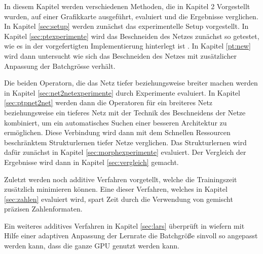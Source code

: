 In diesem Kapitel werden verschiedenen Methoden, die in Kapitel 2 Vorgestellt wurden, auf einer Grafikkarte ausgeführt, evaluiert und die Ergebnisse verglichen. In Kapitel \ref{sec:setup} werden zunächst das experimentelle Setup vorgestellt. In Kapitel \ref{sec:ptexperimente} wird das Beschneiden des Netzes zunächst so getestet, wie es in der vorgefertigten Implementierung hinterlegt ist \cite{ptImpl}. In Kapitel \ref{pt:new} wird dann untersucht wie sich das Beschneiden des Netzes mit zusätzlicher Anpassung der Batchgrösse verhält.

Die beiden Operatorn, die das Netz tiefer beziehungsweise breiter machen werden in Kapitel \ref{sec:net2netexperimente} durch Experimente evaluiert. In Kapitel \ref{sec:ptpnet2net} werden dann die Operatoren für ein breiteres Netz beziehungsweise ein tieferes Netz mit der Technik des Beschneidens der Netze kombiniert, um ein automatisches Suchen einer besseren Architektur zu ermöglichen. Diese Verbindung wird dann mit dem Schnellen Ressourcen beschränktem Strukturlernen tiefer Netze verglichen. Das Strukturlernen wird dafür zunächst in Kapitel \ref{sec:morphexperimente} evaluiert. Der Vergleich der Ergebnisse wird dann in Kapitel \ref{sec:vergleich} gemacht.


Zuletzt werden noch additive Verfahren vorgetellt, welche die Trainingszeit zusätzlich minimieren können.
Eine dieser Verfahren, welches in Kapitel \ref{sec:zahlen} evaluiert wird, spart Zeit durch die Verwendung von gemischt präzisen Zahlenformaten.

Ein weiteres additives Verfahren in Kapitel \ref{sec:lars} überprüft in wiefern mit Hilfe einer adaptiven Anpassung der Lernrate die Batchgröße sinvoll so angepasst werden kann, dass die ganze GPU genutzt werden kann.


\color{black}
